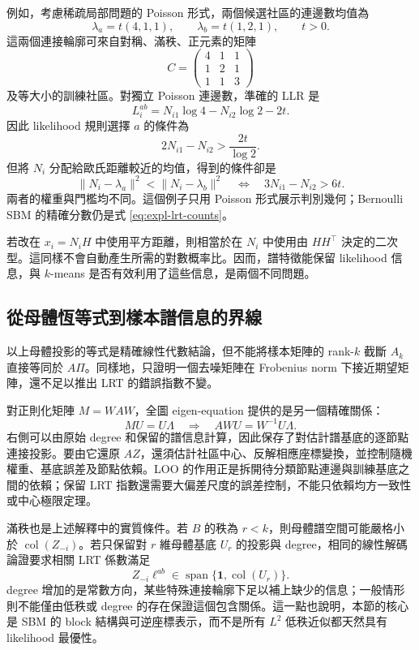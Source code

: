\documentclass[11pt,a4paper]{article}
\theoremstyle{zhplain}
\numberwithin{equation}{section}
\begin{document}
例如，考慮稀疏局部問題的 Poisson 形式，兩個候選社區的連邊數均值為
\[
 \lambda_a=t(4,1,1),\qquad
 \lambda_b=t(1,2,1),\qquad t>0.
\]
這兩個連接輪廓可來自對稱、滿秩、正元素的矩陣
\[
 C=\begin{pmatrix}4&1&1\\1&2&1\\1&1&3\end{pmatrix}
\]
及等大小的訓練社區。對獨立 Poisson 連邊數，準確的 LLR 是
\[
 L_i^{ab}
 =N_{i1}\log4-N_{i2}\log2-2t.
\]
因此 likelihood 規則選擇 $a$ 的條件為
\[
 2N_{i1}-N_{i2}>\frac{2t}{\log2}.
\]
但將 $N_i$ 分配給歐氏距離較近的均值，得到的條件卻是
\[
 \|N_i-\lambda_a\|^2<\|N_i-\lambda_b\|^2
 \quad\Longleftrightarrow\quad
 3N_{i1}-N_{i2}>6t.
\]
兩者的權重與門檻均不同。這個例子只用 Poisson 形式展示判別幾何；Bernoulli SBM 的精確分數仍是式 \eqref{eq:expl-lrt-counts}。

若改在 $x_i=N_iH$ 中使用平方距離，則相當於在 $N_i$ 中使用由 $HH^{\top}$ 決定的二次型。這同樣不會自動產生所需的對數概率比。因而，譜特徵能保留 likelihood 信息，與 $k$-means 是否有效利用了這些信息，是兩個不同問題。

\subsection{從母體恆等式到樣本譜信息的界線}

以上母體投影的等式是精確線性代數結論，但不能將樣本矩陣的 rank-$k$ 截斷 $A_k$ 直接等同於 $A\Pi$。同樣地，只證明一個去噪矩陣在 Frobenius norm 下接近期望矩陣，還不足以推出 LRT 的錯誤指數不變。

對正則化矩陣 $M=WAW$，全圖 eigen-equation 提供的是另一個精確關係：
\[
 MU=U\Lambda
 \quad\Longrightarrow\quad
 AWU=W^{-1}U\Lambda.
\]
右側可以由原始 degree 和保留的譜信息計算，因此保存了對估計譜基底的逐節點連接投影。要由它還原 $AZ$，還須估計社區中心、反解相應座標變換，並控制隨機權重、基底誤差及節點依賴。LOO 的作用正是拆開待分類節點連邊與訓練基底之間的依賴；保留 LRT 指數還需要大偏差尺度的誤差控制，不能只依賴均方一致性或中心極限定理。

滿秩也是上述解釋中的實質條件。若 $B$ 的秩為 $r<k$，則母體譜空間可能嚴格小於 $\operatorname{col}(Z_{-i})$。若只保留對 $r$ 維母體基底 $U_r$ 的投影與 degree，相同的線性解碼論證要求相關 LRT 係數滿足
\[
 Z_{-i}\ell^{ab}
 \in\operatorname{span}\{\mathbf1,\operatorname{col}(U_r)\}.
\]
degree 增加的是常數方向，某些特殊連接輪廓下足以補上缺少的信息；一般情形則不能僅由低秩或 degree 的存在保證這個包含關係。這一點也說明，本節的核心是 SBM 的 block 結構與可逆座標表示，而不是所有 $L^2$ 低秩近似都天然具有 likelihood 最優性。
\end{document}
